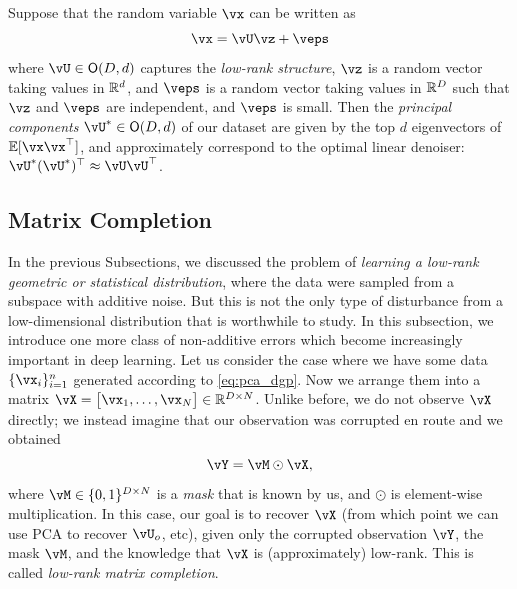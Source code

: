\documentclass[../../book-main.tex]{subfiles}
\begin{document}
\begin{theorem}\label{thm:ppca}
    Suppose that the random variable \(\vx\) can be written as
    \begin{equation}
        \vx = \vU\vz + \veps
    \end{equation}
    where \(\vU \in \O(D, d)\) captures the \textit{low-rank structure}, \(\vz\) is a random vector taking values in \(\mathbb{R}^{d}\), and \(\veps\) is a random vector taking values in \(\mathbb{R}^{D}\) such that \(\vz\) and \(\veps\) are independent, and \(\veps\) is small. Then the \textit{principal components} \(\vU^{\ast} \in \O(D, d)\) of our dataset are given by the top \(d\) eigenvectors of \(\Ex[\vx\vx^{\top}]\), and approximately correspond to the optimal linear denoiser: \(\vU^{\ast}(\vU^{\ast})^{\top} \approx \vU\vU^{\top}\).
\end{theorem}



\subsection{Matrix Completion}

In the previous Subsections, we discussed the problem of \textit{learning a low-rank geometric or statistical distribution}, where the data were sampled from a subspace with additive noise. But this is not the only type of disturbance from a low-dimensional distribution that is worthwhile to study. In this subsection, we introduce one more class of non-additive errors which become increasingly important in deep learning. Let us consider the case where we have some data \(\{\vx_{i}\}_{i = 1}^{n}\) generated according to \eqref{eq:pca_dgp}. Now we arrange them into a matrix \(\vX = \mat{\vx_{1}, \dots, \vx_{N}} \in \R^{D \times N}\). Unlike before, we do not observe \(\vX\) directly; we instead imagine that our observation was corrupted en route and we obtained 
\begin{equation}
    \vY = \vM \odot \vX,
\end{equation}
where \(\vM \in \{0, 1\}^{D \times N}\) is a \textit{mask} that is known by us, and \(\odot\) is element-wise multiplication. In this case, our goal is to recover \(\vX\) (from which point we can use PCA to recover \(\vU_{o}\), etc), given only the corrupted observation \(\vY\), the mask \(\vM\), and the knowledge that \(\vX\) is (approximately) low-rank. This is called \textit{low-rank matrix completion}.
\end{document}
